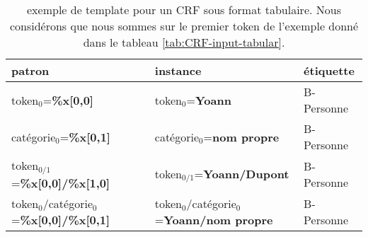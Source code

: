 \documentclass[PhD-Yoann-Dupont.tex]{subfiles}
\begin{document}
\begin{table}[ht!]
\centering
\small
\begin{tabular}{|l|l|l|}
\hline
patron & instance & étiquette\\
\hline
token$_{0}$=\textbf{\%x[0,0]} & token$_{0}$=\textbf{Yoann} & B-Personne \\
catégorie$_{0}$=\textbf{\%x[0,1]} & catégorie$_{0}$=\textbf{nom propre} & B-Personne \\
token$_{0/1}$=\textbf{\%x[0,0]/\%x[1,0]} & token$_{0/1}$=\textbf{Yoann/Dupont} & B-Personne \\
token$_{0}$/catégorie$_{0}$=\textbf{\%x[0,0]/\%x[0,1]} & token$_{0}$/catégorie$_{0}$=\textbf{Yoann/nom propre} & B-Personne \\
\hline
\end{tabular}
\caption{exemple de template pour un CRF sous format tabulaire. Nous considérons que nous sommes sur le premier token de l'exemple donné dans le tableau \ref{tab:CRF-input-tabular}.}
\label{tab:crf-template}
\end{table}
\end{document}
